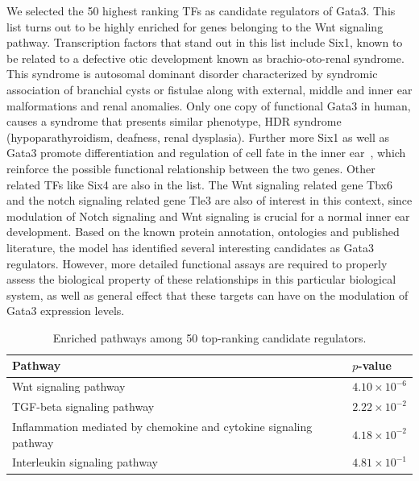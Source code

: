 \documentclass{article}
\begin{document}
We  selected the  50 highest  ranking TFs  as candidate  regulators of
Gata3.  This list turns out  to be highly enriched for genes belonging
to the Wnt signaling pathway.  Transcription factors that stand out in
this  list include  Six1,  known to  be  related to  a defective  otic
development  known  as brachio-oto-renal  syndrome.  This syndrome  is
autosomal dominant disorder  characterized by syndromic association of
branchial cysts or fistulae along  with external, middle and inner ear
malformations and  renal anomalies. Only one copy  of functional Gata3
in  human, causes  a  syndrome that  presents  similar phenotype,  HDR
syndrome (hypoparathyroidism, deafness, renal dysplasia). Further more
Six1 as well  as Gata3 promote differentiation and  regulation of cell
fate in the  inner ear~\cite{Fritzsch2007,Bosman2009}, which reinforce
the  possible functional  relationship between  the two  genes.  Other
related TFs like Six4 are also  in the list. The Wnt signaling related
gene  Tbx6 and  the  notch signaling  related  gene Tle3  are also  of
interest in this context, since  modulation of Notch signaling and Wnt
signaling is crucial for a  normal inner ear development. Based on the
known  protein annotation,  ontologies and  published  literature, the
model   has  identified  several   interesting  candidates   as  Gata3
regulators. However,  more detailed functional assays  are required to
properly assess the biological property of these relationships in this
particular  biological system, as  well as  general effect  that these
targets can have on the modulation of Gata3 expression levels.

\begin{table}[htb]
  \caption{Enriched pathways among 50 top-ranking candidate regulators. }
  \label{tab:pathways}
 \centering
  \begin{tabularx}{\columnwidth}{Xl}
    Pathway & $p$-value \\
    \hline
    Wnt signaling pathway &	$4.10\times 10^{-6}$ \\
    TGF-beta signaling pathway & $2.22\times 10^{-2}$ \\
    Inflammation mediated by chemokine and cytokine signaling pathway & $4.18\times 10^{-2}$ \\
    Interleukin signaling pathway & $4.81\times 10^{-1}$\\
  \end{tabularx}
 \end{table}
\end{document}
